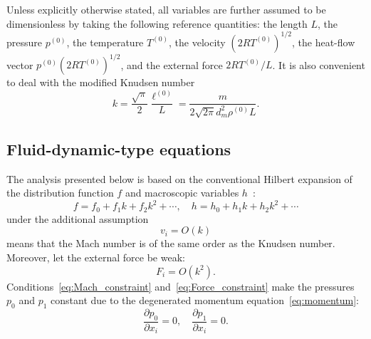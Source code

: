 \documentclass[smallextended]{svjour3} %
\newcommand{\pder}[2][]{\frac{\partial#1}{\partial#2}}
\begin{document}
Unless explicitly otherwise stated, all variables are further assumed to be dimensionless
by taking the following reference quantities:
the length \(L\), the pressure \(p^{(0)}\), the temperature \(T^{(0)}\),
the velocity \((2RT^{(0)})^{1/2}\), the heat-flow vector \(p^{(0)}(2RT^{(0)})^{1/2}\),
and the external force \(2RT^{(0)}/L\).
It is also convenient to deal with the modified Knudsen number
\[ k = \frac{\sqrt\pi}2\frac{\ell^{(0)}}{L} = \frac{m}{2\sqrt{2\pi} d_m^2 \rho^{(0)}L}. \]

\subsection{Fluid-dynamic-type equations}

The analysis presented below is based on the conventional Hilbert expansion
of the distribution function \(f\) and macroscopic variables \(h\)~\cite{Hilbert1912}:
\[ f = f_0 + f_1k + f_2k^2 + \cdots, \quad h = h_0 + h_1k + h_2k^2 + \cdots \]
under the additional assumption
\begin{equation}\label{eq:Mach_constraint}
    v_i = O(k)
\end{equation}
means that the Mach number is of the same order as the Knudsen number.
Moreover, let the external force be weak:
\begin{equation}\label{eq:Force_constraint}
    F_i = O(k^2).
\end{equation}
Conditions~\eqref{eq:Mach_constraint} and~\eqref{eq:Force_constraint} make the pressures
\(p_0\) and \(p_1\) constant due to the degenerated momentum equation~\eqref{eq:momentum}:
\begin{equation}
    \pder[p_0]{x_i} = 0, \quad \pder[p_1]{x_i} = 0.
\end{equation}
\end{document}
